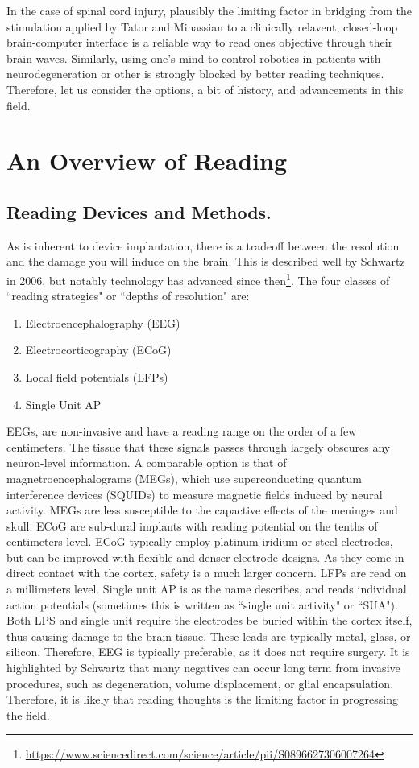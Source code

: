 In the case of spinal cord injury, plausibly the limiting factor in bridging from the stimulation applied by Tator and Minassian to a clinically relavent, closed-loop brain-computer interface is a reliable way to read ones objective through their brain waves. Similarly, using one's mind to control robotics in patients with neurodegeneration or other is strongly blocked by better reading techniques. Therefore, let us consider the options, a bit of history, and advancements in this field.

\section{An Overview of Reading} 

\subsection{Reading Devices and Methods.}

As is inherent to device implantation, there is a tradeoff between the resolution and the damage you will induce on the brain. This is described well by Schwartz in 2006, but notably technology has advanced since then\footnote{\url{https://www.sciencedirect.com/science/article/pii/S0896627306007264}}. The four classes of ``reading strategies" or ``depths of resolution" are: 
\begin{enumerate}
    \itemsep 0em
    \item Electroencephalography (EEG)
    \item Electrocorticography (ECoG)
    \item Local field potentials (LFPs)
    \item Single Unit AP
\end{enumerate}

EEGs, are non-invasive and have a reading range on the order of a few centimeters. The tissue that these signals passes through largely obscures any neuron-level information. A comparable option is that of magnetroencephalograms (MEGs), which use superconducting quantum interference devices (SQUIDs) to measure magnetic fields induced by neural activity. MEGs are less susceptible to the capactive effects of the meninges and skull. ECoG are sub-dural implants with reading potential on the tenths of centimeters level. ECoG typically employ platinum-iridium or steel electrodes, but can be improved with flexible and denser electrode designs. As they come in direct contact with the cortex, safety is a much larger concern. LFPs are read on a millimeters level. Single unit AP is as the name describes, and reads individual action potentials (sometimes this is written as ``single unit activity" or ``SUA"). Both LPS and single unit require the electrodes be buried within the cortex itself, thus causing damage to the brain tissue. These leads are typically metal, glass, or silicon. Therefore, EEG is typically preferable, as it does not require surgery. It is highlighted by Schwartz that many negatives can occur long term from invasive procedures, such as degeneration, volume displacement, or glial encapsulation. Therefore, it is likely that reading thoughts is the limiting factor in progressing the field. \newline

